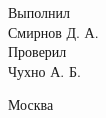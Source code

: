 \documentclass[14pt,a4paper,oneside]{extbook}
\begin{document}
\begin{titlepage}
		\vspace{5em}                                                          
		
		\begin{center}                                                        
			
		\end{center}                                                         
		\vspace{6em}                                                          
		
		
		\quad\tabto{320pt}Выполнил \\                                     
		\tabto{320pt}Смирнов Д. А.\\                                           
		\vspace{1.2em}                                                       
		\tabto{320pt}Проверил \\                                                      
		\tabto{320pt}Чухно А. Б.\\                                        
		\begin{comment}                          
		\begin{alltt}                                                         
		РќР°СѓС‡РЅС‹Р№ СЂСѓРєРѕРІРѕРґРёС‚РµР»СЊ                                             
		Рґ.С„.Рј.РЅ., Andrey Р’.Рђ.                                            
		Р РµС†РµРЅР·РµРЅС‚                                                        
		Рє.С„.-Рј.РЅ. Olegovich Р’.Р.                                         
		\end{alltt}                                             
		\end{comment}                                                                                        
		
		\vspace{\fill}                                                    
		
		\begin{center}                                                        
			Москва \the\year{}                                                                
		\end{center}                                                          
	\end{titlepage}
	\setcounter{page}{2}
	\tableofcontents
	
\end{document}
